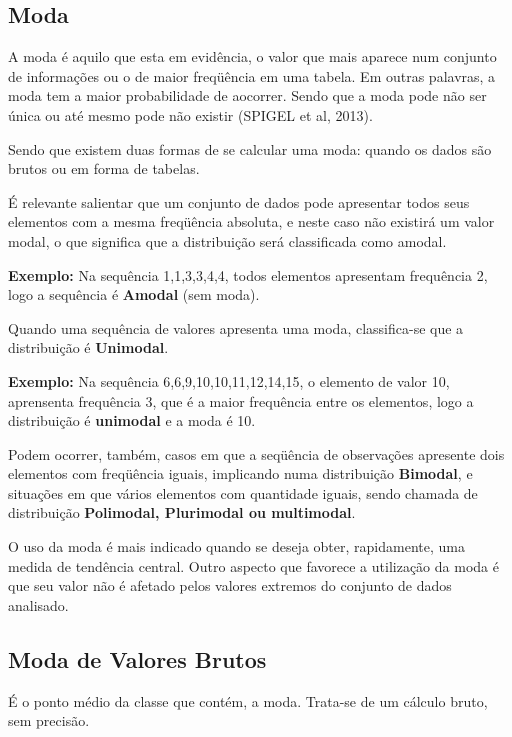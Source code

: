 \subsection{Moda}

A moda é aquilo que esta em evidência, o valor que mais aparece num conjunto de informações ou o de maior freqüência em uma tabela. Em outras palavras, a moda tem a maior probabilidade de aocorrer. Sendo que a moda pode não ser única ou até mesmo pode não existir (SPIGEL et al, 2013).\vskip0.3cm


Sendo que existem duas formas de se calcular uma moda: quando os dados são brutos ou em forma de tabelas.\vskip0.3cm

É relevante salientar que um conjunto de dados pode apresentar todos seus elementos com a mesma freqüência absoluta, e neste caso não existirá um valor modal, o que significa que a distribuição será classificada como amodal.\vskip0.3cm

\textbf{Exemplo:} Na sequência 1,1,3,3,4,4, todos elementos apresentam frequência 2, logo a sequência é \textbf{Amodal} (sem moda).\vskip0.3cm

Quando uma sequência de valores apresenta uma moda, classifica-se que a distribuição é \textbf{Unimodal}.\vskip0.3cm


\textbf{Exemplo:} Na sequência 6,6,9,10,10,11,12,14,15, o elemento de valor 10, aprensenta frequência 3, que é a maior frequência entre os elementos, logo a distribuição é \textbf{unimodal} e a moda é 10.\vskip0.3cm

Podem ocorrer, também, casos em que a seqüência de observações apresente dois elementos com freqüência iguais, implicando numa distribuição \textbf{Bimodal}, e situações em que vários elementos com quantidade iguais, sendo chamada de distribuição \textbf{Polimodal, Plurimodal ou multimodal}.\vskip0.3cm

O uso da moda é mais indicado quando se deseja obter, rapidamente, uma medida de tendência central. Outro aspecto que favorece a utilização da moda é que seu valor não é afetado pelos valores extremos do conjunto de dados analisado.\vskip0.3cm

\subsection{Moda de Valores Brutos}

\vskip0.3cm


É o ponto médio da classe que contém, a moda. Trata-se de um cálculo bruto, sem precisão.

